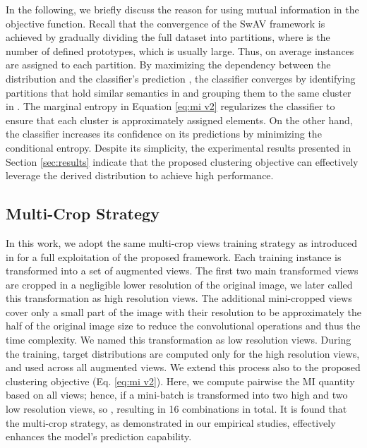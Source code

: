 \documentclass[journal]{IEEEtran}
\begin{document}
In the following, we briefly discuss the reason for using mutual information in the objective function. Recall that the convergence of the SwAV \cite{caron2020unsupervised} framework is achieved by gradually dividing the full dataset into  partitions, where  is the number of defined prototypes, which is usually large. Thus, on average  instances are assigned to each partition. By maximizing the dependency between the distribution  and the classifier's prediction , the classifier converges by identifying partitions that hold similar semantics in  and grouping them to the same cluster in . The marginal entropy in Equation \ref{eq:mi v2} regularizes the classifier to ensure that each cluster is approximately assigned  elements. On the other hand, the classifier increases its confidence on its predictions by minimizing the conditional entropy. Despite its simplicity, the experimental results presented in Section \ref{sec:results} indicate that the proposed clustering objective can effectively leverage the derived distribution  to achieve high performance. \par

\subsection{Multi-Crop Strategy} 
In this work, we adopt the same multi-crop views training strategy as introduced in \cite{caron2020unsupervised} for a full exploitation of the proposed framework. Each training instance is transformed into a set of augmented views. The first two main transformed views are cropped in a negligible lower resolution of the original image, we later called this transformation as high resolution views. The additional mini-cropped views cover only a small part of the image with their resolution to be approximately the half of the original image size to reduce the convolutional operations and thus the time complexity. We named this transformation as low resolution views. During the training,  target distributions are computed only for the high resolution views, and used across all augmented views. We extend this process also to the proposed clustering objective (Eq. \ref{eq:mi v2}). Here, we compute pairwise the MI quantity based on all views; hence, if a mini-batch is transformed into two high and two low resolution views, so , resulting in 16 combinations in total. It is found that the multi-crop strategy, as demonstrated in our empirical studies, effectively enhances the model's prediction capability.
\end{document}
